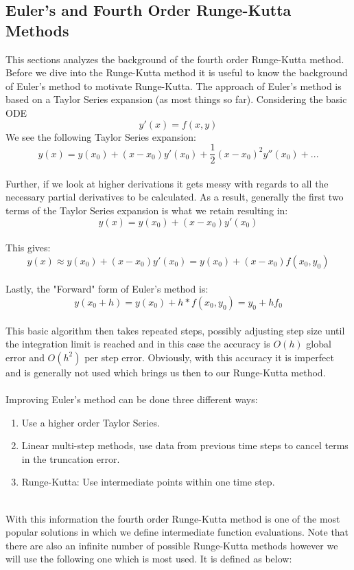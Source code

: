 \documentclass{article}
\begin{document}
\subsection{Euler's and Fourth Order Runge-Kutta Methods}
This sections analyzes the background of the fourth order Runge-Kutta method.\\
Before we dive into the Runge-Kutta method it is useful to know the background of Euler's method to motivate Runge-Kutta. The approach of Euler's method is based on a Taylor Series expansion (as most things so far). Considering the basic ODE $$y'(x) = f(x,y)$$ 
We see the following Taylor Series expansion:\\
$$y(x) = y(x_0) + (x - x_0) y'(x_0) + \frac{1}{2}(x - x_0)^2 y''(x_0) + ...$$
\\
Further, if we look at higher derivations it gets messy with regards to all the necessary partial derivatives to be calculated. As a result, generally the first two terms of the Taylor Series expansion is what we retain resulting in: $$y(x) = y(x_0) + (x - x_0) y'(x_0)$$
\\
This gives: $$y(x) \approx y(x_0) + (x - x_0)y'(x_0) = y(x_0) + (x-x_0)f(x_0, y_0)$$
\\
Lastly, the "Forward" form of Euler's method is: $$y(x_0 + h) = y(x_0) + h*f(x_0,y_0) = y_0 + h f_0$$
\\
This basic algorithm then takes repeated steps, possibly adjusting step size until the integration limit is reached and in this case the accuracy is $O(h)$ global error and $O(h^2)$ per step error. Obviously, with this accuracy it is imperfect and is generally not used which brings us then to our Runge-Kutta method.\\
\\
Improving Euler's method can be done three different ways: 
\begin{enumerate}
    \item Use a higher order Taylor Series.
    \item Linear multi-step methods, use data from previous time steps to cancel terms in the truncation error.
    \item Runge-Kutta: Use intermediate points within one time step.
\end{enumerate}
\\
With this information the fourth order Runge-Kutta method is one of the most popular solutions in which we define intermediate function evaluations. Note that there are also an infinite number of possible Runge-Kutta methods however we will use the following one which is most used. It is defined as below:\\
\end{document}
